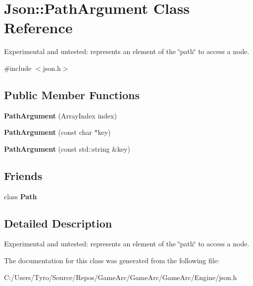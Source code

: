 \hypertarget{class_json_1_1_path_argument}{}\section{Json\+::Path\+Argument Class Reference}
\label{class_json_1_1_path_argument}


Experimental and untested\+: represents an element of the \char`\"{}path\char`\"{} to access a node.  




{\ttfamily \#include $<$json.\+h$>$}

\subsection*{Public Member Functions}
\begin{DoxyCompactItemize}
\item 
\mbox{\label{class_json_1_1_path_argument_a53c5b27143b161301b95fd544c139ecf}} 
{\bfseries Path\+Argument} (Array\+Index index)
\item 
\mbox{\label{class_json_1_1_path_argument_a9690417a8a40e6e49f2acdf6c9281345}} 
{\bfseries Path\+Argument} (const char $\ast$key)
\item 
\mbox{\label{class_json_1_1_path_argument_a08f872cfee4fc600f7fa3bcaaff0d41c}} 
{\bfseries Path\+Argument} (const std\+::string \&key)
\end{DoxyCompactItemize}
\subsection*{Friends}
\begin{DoxyCompactItemize}
\item 
\mbox{\label{class_json_1_1_path_argument_a4877239a6b7f09fbf5a61ca68a49d74c}} 
class {\bfseries Path}
\end{DoxyCompactItemize}


\subsection{Detailed Description}
Experimental and untested\+: represents an element of the \char`\"{}path\char`\"{} to access a node. 

The documentation for this class was generated from the following file\+:\begin{DoxyCompactItemize}
\item 
C\+:/\+Users/\+Tyro/\+Source/\+Repos/\+Game\+Arc/\+Game\+Arc/\+Game\+Arc/\+Engine/json.\+h\end{DoxyCompactItemize}
